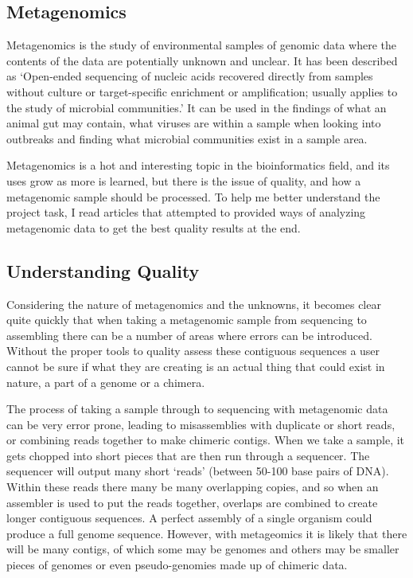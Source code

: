\subsection{Metagenomics}
Metagenomics is the study of environmental samples of genomic data where the contents of the data are potentially unknown and unclear. It has been described as `Open-ended sequencing of nucleic acids recovered directly from samples without culture or target-specific enrichment or amplification; usually applies to the study of microbial communities.'\cite{citeulike:14021056} It can be used in the findings of what an animal gut may contain, what viruses are within a sample when looking into outbreaks and finding what microbial communities exist in a sample area.

Metagenomics is a hot and interesting topic in the bioinformatics field, and its uses grow as more is learned, but there is the issue of quality, and how a metagenomic sample should be processed. To help me better understand the project task, I read articles that attempted to provided ways of analyzing metagenomic data to get the best quality results at the end.\cite{citeulike:11448654}

\subsection{Understanding Quality}

Considering the nature of metagenomics and the unknowns, it becomes clear quite quickly that when taking a metagenomic sample from sequencing to assembling there can be a number of areas where errors can be introduced. Without the proper tools to quality assess these contiguous sequences a user cannot be sure if what they are creating is an actual thing that could exist in nature, a part of a genome or a chimera.

The process of taking a sample through to sequencing with metagenomic data can be very error prone, leading to misassemblies with duplicate or short reads, or combining reads together to make chimeric contigs.\cite{citeulike:3746363} When we take a sample, it gets chopped into short pieces that are then run through a sequencer. The sequencer will output many short `reads' (between 50-100 base pairs of DNA). Within these reads there many be many overlapping copies, and so when an assembler is used to put the reads together, overlaps are combined to create longer contiguous sequences. A perfect assembly of a single organism could produce a full genome sequence. However, with metageomics it is likely that there will be many contigs, of which some may be genomes and others may be smaller pieces of genomes or even pseudo-genomies made up of chimeric data.

